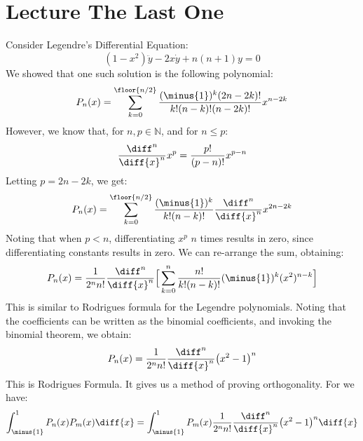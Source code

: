     \section{Lecture The Last One}
        Consider Legendre's Differential Equation:
        \begin{equation}
            (1-x^{2})\ddot{y}-2x\dot{y}+n(n+1)y=0
        \end{equation}
        We showed that one such solution is the following
        polynomial:
        \begin{equation}
            P_{n}(x)=\sum_{k=0}^{\floor{n/2}}
                \frac{(\minus{1})^{k}(2n-2k)!}{k!(n-k)!(n-2k)!}
                    x^{n-2k}
        \end{equation}
        However, we know that, for $n,p\in\mathbb{N}$, and for
        $n\leq{p}$:
        \begin{equation}
            \frac{\diff^{n}}{\diff{x}^{n}}x^{p}=
            \frac{p!}{(p-n)!}x^{p-n}
        \end{equation}
        Letting $p=2n-2k$, we get:
        \begin{equation}
            P_{n}(x)=\sum_{k=0}^{\floor{n/2}}
                \frac{(\minus{1})^{k}}{k!(n-k)!}
                \frac{\diff^{n}}{\diff{x}^{n}}x^{2n-2k}
        \end{equation}
        Noting that when $p<n$, differentiating $x^{p}$ $n$ times
        results in zero, since differentiating constants results
        in zero. We can re-arrange the sum, obtaining:
        \begin{equation}
            P_{n}(x)=\frac{1}{2^{n}n!}\frac{\diff^{n}}{\diff{x}^{n}}
                \Big[\sum_{k=0}^{n}\frac{n!}{k!(n-k)!}
                    (\minus{1})^{k}(x^{2})^{n-k}\Big]
        \end{equation}
        This is similar to Rodrigues formula for the
        Legendre polynomials.
        Noting that the coefficients can be written as the
        binomial coefficients, and invoking the binomial theorem,
        we obtain:
        \begin{equation}
            P_{n}(x)=\frac{1}{2^{n}n!}\frac{\diff^{n}}{\diff{x}^{n}}
                \big(x^{2}-1\big)^{n}
        \end{equation}
        This is Rodrigues Formula. It gives us a method of
        proving orthogonality. For we have:
        \begin{equation}
            \int_{\minus{1}}^{1}P_{n}(x)P_{m}(x)\diff{x}
            =\int_{\minus{1}}^{1}P_{m}(x)\frac{1}{2^{n}n!}
                \frac{\diff^{n}}{\diff{x}^{n}}
                \big(x^{2}-1\big)^{n}\diff{x}
        \end{equation}
